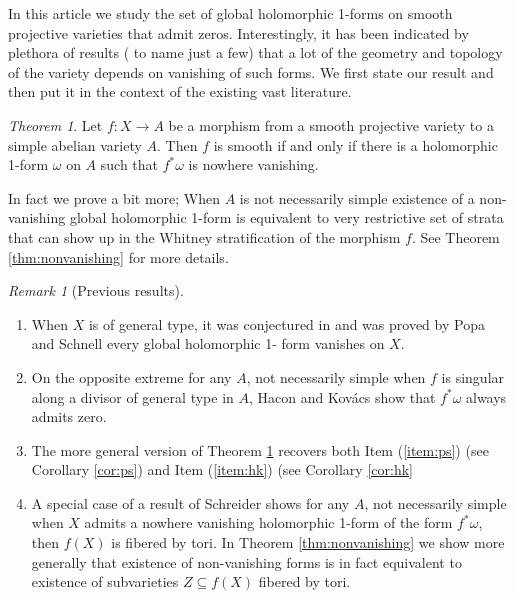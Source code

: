 \documentclass[a4paper,12pt,reqno]{amsart}
\theoremstyle{plain}
\theoremstyle{remark}
\newtheorem{remark}[theorem]{Remark}
\newtheorem{alphtheorem}{Theorem}
\begin{document}
In this article we study the set of global holomorphic 1-forms  on smooth projective varieties that admit zeros. Interestingly, it has been
indicated by plethora of results (\cite{HK05, LZ05, EL,
SS19, SH19, PS14} to name just a few) that a lot of the geometry
and topology of the variety depends on vanishing of such forms.
We first state our result and then put it in the context of 
the existing vast literature.
\begin{alphtheorem}\label{thm:smooth}
Let $f:X\to A$ be a morphism from a smooth projective variety to a simple abelian variety $A$. Then $f$ is smooth if and only if there is a holomorphic 1-form $\omega$ on $A$ such that $f^*\omega$ is nowhere vanishing. 
\end{alphtheorem}
In fact we prove a bit more; When $A$ is not necessarily simple
existence of a non-vanishing global holomorphic 1-form
is equivalent to very restrictive set of strata that can show 
up in the Whitney stratification of the morphism $f$.
See Theorem \ref{thm:nonvanishing} for more details.
\begin{remark}[Previous results]
\begin{enumerate}
\item \label{item:ps} When $X$ is of general type, it was conjectured in
	\cite{HK05, LZ05} and was proved
	by Popa and Schnell \cite{PS14} every global holomorphic 1-		
	form vanishes on $X$. 
\item \label{item:hk} On the opposite extreme for any $A$, not necessarily simple when $f$ is singular along a divisor of general
		type in $A$, Hacon and Kov\'acs \cite[Proposition 3.5.]{HK05} show that
		$f^*\omega$ always admits zero.
\item The more general version of Theorem \ref{thm:smooth}
recovers both Item (\ref{item:ps}) (see Corollary \ref{cor:ps})
and Item (\ref{item:hk}) (see Corollary \ref{cor:hk}
\item A special case of a result of 
Schreider \cite[Corollary 1.5]{SS19} shows for any $A$, not necessarily simple when $X$
admits a nowhere vanishing holomorphic 1-form of the form
$f^*\omega$, then $f(X)$ is fibered by tori. In 
Theorem \ref{thm:nonvanishing} we show more generally that 
existence of non-vanishing forms is in fact equivalent to existence of subvarieties $Z\subseteq f(X)$ fibered by tori. 
\end{enumerate}
\end{remark}
\end{document}
